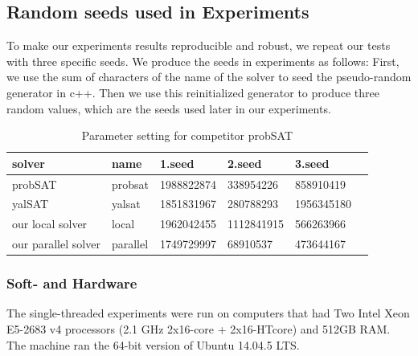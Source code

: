 \documentclass[12pt,a4paper,twoside]{scrartcl}
\numberwithin{equation}{section}
\begin{document}
\subsection{Random seeds used in Experiments}
To make our experiments results reproducible and robust, we repeat our tests with three specific seeds. We produce the seeds in experiments as follows: First, we use the sum of characters of the name of the solver to seed the pseudo-random generator in c++.  Then we use this reinitialized generator to produce three random values, which are the seeds used later in our experiments. 
\begin{table}[h!]
\begin{center}
    \begin{tabular}{|l|l|l|l|l|p{1cm}|}
\hline 
    solver&name&1.seed&2.seed&3.seed \\ \hline
	probSAT&probsat&1988822874&338954226 &858910419 \\ \hline
	yalSAT &yalsat&1851831967&280788293&1956345180 \\ \hline
	our local solver & local&1962042455&1112841915&566263966 \\ \hline
	our parallel solver & parallel &1749729997& 68910537& 473644167 \\ \hline
	
\end{tabular}
\caption[probSAT]{Parameter setting for competitor probSAT}
\end{center}
\end{table} 
\subsubsection{Soft- and Hardware}
The single-threaded experiments were run on computers that had Two Intel Xeon E5-2683 v4 processors  (2.1 GHz 2x16-core + 2x16-HTcore) and 512GB RAM. The machine ran the 64-bit version
of  Ubuntu 14.04.5 LTS. 
\end{document}
